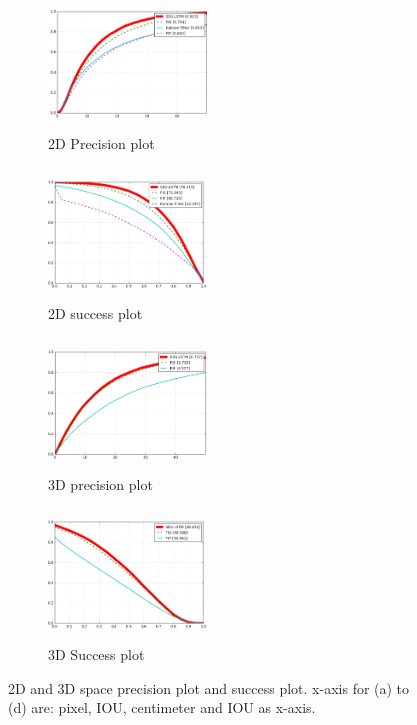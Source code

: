 \documentclass[10pt,twocolumn,letterpaper]{article}
\begin{document}
\begin{figure}[t]
       \centering
        \begin{subfigure}[c]{0.24\textwidth}
        \centering
                \includegraphics[width=4.2cm,height=3.5cm, clip]{figures/precision_plot_2d.png}
    \caption{\small{2D Precision plot}}
        \end{subfigure}
        \begin{subfigure}[c]{0.24\textwidth}
        \centering
                \includegraphics[width=4.2cm,height=3.5cm, clip]{figures/success_plot_2d.png}
        \caption{\small{2D success plot}}
        \end{subfigure}
       \begin{subfigure}[c]{0.24\textwidth}
        \centering
                \includegraphics[width=4.2cm,height=3.5cm, clip]{figures/precision_plot_3d_20cm.png}
    \caption{\small{3D precision plot}}
        \end{subfigure}
               \begin{subfigure}[c]{0.24\textwidth}
        \centering
                \includegraphics[width=4.2cm,height=3.5cm, clip]{figures/success_plot_3d.png}
        \caption{\small{3D Success plot}}
        \end{subfigure}
        
\caption{\small{ 2D and 3D space precision plot and success plot. x-axis for (a) to (d) are: pixel, IOU, centimeter and IOU as x-axis.}}
\label{fig:precision_plot_and_success_plot}
\end{figure}
\end{document}
